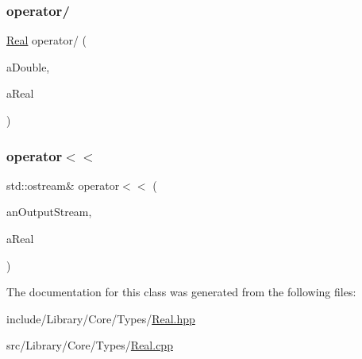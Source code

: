 \mbox{\label{classlibrary_1_1core_1_1types_1_1_real_a98345c81e7b374941fc15cbbd6922c5d}} 
\subsubsection{\texorpdfstring{operator/}{operator/}}
{\footnotesize\ttfamily \hyperlink{classlibrary_1_1core_1_1types_1_1_real}{Real} operator/ (\begin{DoxyParamCaption}\item[{const \hyperlink{classlibrary_1_1core_1_1types_1_1_real_a9c5c8826b7e5a8e39544d23fea6c0e1c}{Real\+::\+Value\+Type} \&}]{a\+Double,  }\item[{const \hyperlink{classlibrary_1_1core_1_1types_1_1_real}{Real} \&}]{a\+Real }\end{DoxyParamCaption})\hspace{0.3cm}{\ttfamily [friend]}}

\mbox{\label{classlibrary_1_1core_1_1types_1_1_real_a36816b0e006fd2ec3b0c53406439c7c3}} 
\subsubsection{\texorpdfstring{operator$<$$<$}{operator<<}}
{\footnotesize\ttfamily std\+::ostream\& operator$<$$<$ (\begin{DoxyParamCaption}\item[{std\+::ostream \&}]{an\+Output\+Stream,  }\item[{const \hyperlink{classlibrary_1_1core_1_1types_1_1_real}{Real} \&}]{a\+Real }\end{DoxyParamCaption})\hspace{0.3cm}{\ttfamily [friend]}}



The documentation for this class was generated from the following files\+:\begin{DoxyCompactItemize}
\item 
include/\+Library/\+Core/\+Types/\hyperlink{_real_8hpp}{Real.\+hpp}\item 
src/\+Library/\+Core/\+Types/\hyperlink{_real_8cpp}{Real.\+cpp}\end{DoxyCompactItemize}
